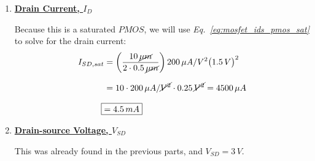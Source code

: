 \documentclass[12pt, fleqn]{article}
\begin{document}
\begin{enumerate}[label=(\alph*)]
{\begin{enumerate}[label=(\roman*)]
{        \vspace{0.15cm}
        This is a $DC$ circuit with a $PMOS$ transistor.  There is no current going into the gate of the MOSFET, so we can easily calculate the current traveling through both resistors:
        \begin{equation*}
            I_R = \frac{3\,V}{10\,k\Omega + 20\,k\Omega} = \frac{3\,V}{30\,k\Omega} = 0.1\,mA
        \end{equation*}
        Then the gate voltage is simply the drop across the $20\,k\Omega$ resistor subtracted from the supply rail:
        \begin{equation*}
            V_G = 3\,V - (0.1\,mA \cdot 20\,k\Omega) = 1\,V
        \end{equation*}
        We have $V_{SG} = V_S - V_G = 3\,V - 1\,V = 2\,V > \left|V_{T_p}\right| = 0.5\,V$, so the device is on.
        
        \vspace{0.25cm}
        Furthermore, because this is a $DC$ circuit, at steady-state the capacitor will be an open circuit, and the inductor will act as a wire.  Then $V_D = 0\,V$, and we can also see that $V_{SD} = 3\,V > V_{SG} - \left|V_{T_p}\right| = 1.5\,V$.
        
        \vspace{0.5cm}
        $\boxed{\therefore\quad{\text{The device is in \textit{saturation}.}}}$
        }
        \vspace{0.25cm}
        \item
        {
        \underline{\textbf{Drain Current, $I_D$}}
        
        \vspace{0.15cm}
        Because this is a saturated $PMOS$, we will use \textit{Eq.~\ref{eq:mosfet_ids_pmos_sat}} to solve for the drain current:
        \begin{align*}
            I_{SD,sat} &= \left(\frac{10\,\cancel{\mu m}}{2 \cdot 0.5\,\cancel{\mu m}}\right) 200\,\mu A/V^2{\big(1.5\,V\big)}^2\\[0.25cm]
            &= 10 \cdot 200\,\mu A/\cancel{V^2} \cdot 0.25\,\cancel{V^2} = 4500\,\mu A\\[0.25cm]
            \Aboxed{&= 4.5\,mA}
        \end{align*}
        }
        \vspace{0.25cm}
        \item
        {
        \underline{\textbf{Drain-source Voltage, $V_{SD}$}}
        
        \vspace{0.15cm}
        This was already found in the previous parts, and $\boxed{V_{SD} = 3\,V}$.
        }
    \end{enumerate}
    }
    \newpage\noindent
\end{enumerate}
\newpage
\end{document}
